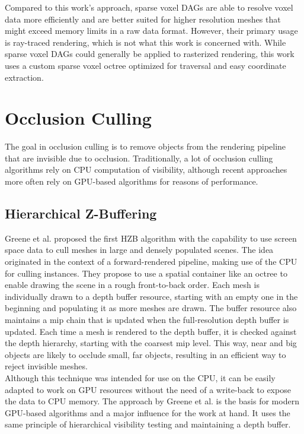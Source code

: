 \noindent
Compared to this work's approach, sparse voxel \ac{DAG}s are able to resolve voxel data more efficiently and are 
better suited for higher resolution meshes that might exceed memory limits in a raw data format. However, their 
primary usage is ray-traced rendering, which is not what this work is concerned with. While sparse voxel \ac{DAG}s 
could generally be applied to rasterized rendering, this work uses a custom sparse voxel octree optimized for 
traversal and easy coordinate extraction. 

\clearpage

\section{Occlusion Culling}

The goal in occlusion culling is to remove objects from the rendering pipeline that are invisible due to 
occlusion. Traditionally, a lot of occlusion culling algorithms rely on \ac{CPU} computation of visibility, 
although recent approaches more often rely on \ac{GPU}-based algorithms for reasons of performance. 


\subsection*{Hierarchical Z-Buffering}

Greene et al. \cite{Greene93,Greene95} proposed the first \ac{HZB} algorithm with the capability to use screen space 
data to cull meshes in large and densely populated scenes. The idea originated in the context of a forward-rendered 
pipeline, making use of the \ac{CPU} for culling instances. They propose to use a spatial container like an octree to 
enable drawing the scene in a rough front-to-back order. Each mesh is individually drawn to a depth buffer resource, 
starting with an empty one in the beginning and populating it as more meshes are drawn. The buffer resource also 
maintains a mip chain that is updated when the full-resolution depth buffer is updated. Each time a mesh is rendered 
to the depth buffer, it is checked against the depth hierarchy, starting with the coarsest mip level. This way, near 
and big objects are likely to occlude small, far objects, resulting in an efficient way to reject invisible meshes.\\

\noindent
Although this technique was intended for use on the \ac{CPU}, it can be easily adapted to work on \ac{GPU} resources 
without the need of a write-back to expose the data to \ac{CPU} memory. The approach by Greene et al. is the basis for 
modern \ac{GPU}-based algorithms and a major influence for the work at hand. It uses the same principle of hierarchical 
visibility testing and maintaining a depth buffer. \\

